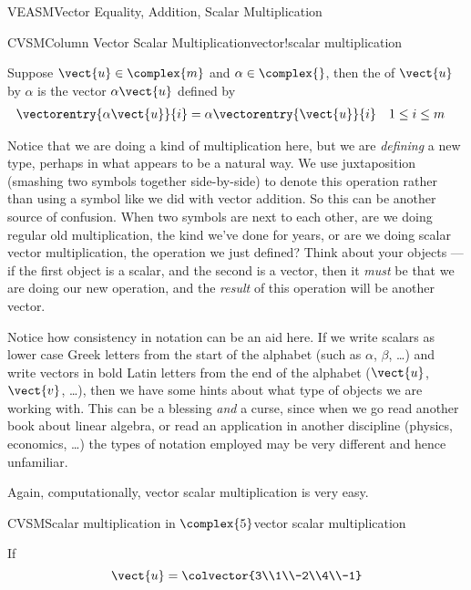 \begin{subsect}{VEASM}{Vector Equality, Addition, Scalar Multiplication}
\begin{definition}{CVSM}{Column Vector Scalar Multiplication}{vector!scalar multiplication}
\begin{para}Suppose $\vect{u}\in\complex{m}$ and $\alpha\in\complex{\null}$, then the  of $\vect{u}$ by $\alpha$ is the vector $\alpha\vect{u}$ defined by
%
\begin{align*}
\vectorentry{\alpha\vect{u}}{i}
&=\alpha\vectorentry{\vect{u}}{i}
&&1\leq i\leq m
\end{align*}
\end{para}
%
\end{definition}
%
\begin{para}Notice that we are doing a kind of multiplication here, but we are {\em defining} a new type, perhaps in what appears to be a natural way.  We use juxtaposition (smashing two symbols together side-by-side) to denote this operation rather than using a symbol like we did with vector addition.  So this can be another source of confusion.  When two symbols are next to each other, are we doing regular old multiplication, the kind we've done for years, or are we doing scalar vector multiplication, the operation we just defined?  Think about your objects --- if the first object is a scalar, and the second is a vector, then it {\em must} be that we are doing our new operation, and the {\em result} of this operation will be another vector.\end{para}
%
\begin{para}Notice how consistency in notation can be an aid here.  If we write scalars as lower case Greek letters from the start of the alphabet (such as $\alpha$, $\beta$, \dots) and write vectors in bold Latin letters from the end of the alphabet ($\vect{u}$, $\vect{v}$, \dots), then we have some hints about what type of objects we are working with.  This can be a blessing {\em and} a curse, since when we go read another book about linear algebra, or read an application in another discipline (physics, economics, \dots) the types of notation employed may be very different and hence unfamiliar.\end{para}
%
\begin{para}Again, computationally, vector scalar multiplication is very easy.\end{para}
%
\begin{example}{CVSM}{Scalar multiplication in $\complex{5}$}{vector scalar multiplication}
\begin{para}If
%
\begin{equation*}
\vect{u}=\colvector{3\\1\\-2\\4\\-1}

\end{equation*}
\end{para}
\end{example}
\end{subsect}
